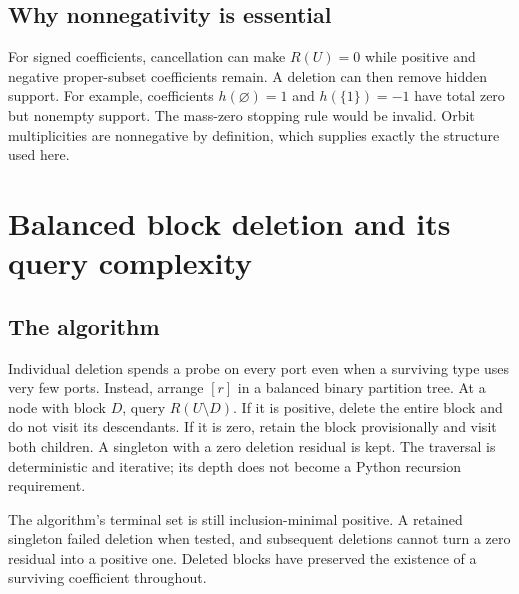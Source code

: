 \documentclass[11pt]{article}
\theoremstyle{definition}
\begin{document}
\subsection{Why nonnegativity is essential}
For signed coefficients, cancellation can make $R(U)=0$ while positive and
negative proper-subset coefficients remain. A deletion can then remove
hidden support. For example, coefficients $h(\varnothing)=1$ and
$h(\{1\})=-1$ have total zero but nonempty support. The mass-zero stopping
rule would be invalid. Orbit multiplicities are nonnegative by definition,
which supplies exactly the structure used here.

\section{Balanced block deletion and its query complexity}
\label{sec:blocks}

\subsection{The algorithm}
Individual deletion spends a probe on every port even when a surviving type
uses very few ports. Instead, arrange $[r]$ in a balanced binary partition
tree. At a node with block $D$, query $R(U\setminus D)$. If it is positive,
delete the entire block and do not visit its descendants. If it is zero,
retain the block provisionally and visit both children. A singleton with a
zero deletion residual is kept. The traversal is deterministic and iterative;
its depth does not become a Python recursion requirement.

The algorithm's terminal set is still inclusion-minimal positive. A retained
singleton failed deletion when tested, and subsequent deletions cannot turn
a zero residual into a positive one. Deleted blocks have preserved the
existence of a surviving coefficient throughout.
\end{document}
